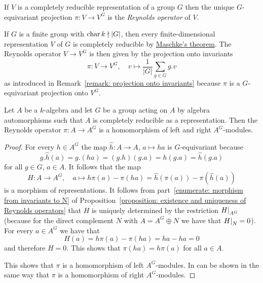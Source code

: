 \begin{definition}
  If $V$ is a completely reducible representation of a group $G$ then the unique $G$-equivariant projection $\pi \colon V \to V^G$ is the \emph{Reynolds operator} of $V$.
\end{definition}


\begin{example}
  If $G$ is a finite group with $\operatorname{char}{k} \nmid |G|$, then every finite-dimensional representation $V$ of $G$ is completely reducible by \hyperref[theorem: maschkes theorem]{Maschke’s theorem}.
  The Reynolds operator $V \to V^G$ is then given by the projection onto invariants
  \[
            \pi
    \colon  V
    \to     V^G,
    \quad   v
    \mapsto \frac{1}{|G|} \sum_{g \in G} g.v
  \]
  as introduced in Remark~\ref{remark: projection onto invariants} because $\pi$ is a $G$-equivariant projection onto $V^G$.
\end{example}


\begin{lemma}
  \label{lemma: reynolds operator is homomorphism}
  Let $A$ be a $k$-algebra and let $G$ be a group acting on $A$ by algebra automorphisms such that $A$ is completely reducible as a representation.
  Then the Reynolds operator $\pi \colon A \to A^G$ is a homomorphism of left and right $A^G$-modules.
\end{lemma}


\begin{proof}
  For every $h \in A^G$ the map $\hat{h} \colon A \to A$, $a \mapsto ha$ is $G$-equivariant because
  \[
      g.\hat{h}(a)
    = g.(ha)
    = (g.h)(g.a)
    = h(g.a)
    = \hat{h}(g.a)
  \]
  for all $g \in G$, $a \in A$.
  It follows that the map
  \[
            H
    \colon  A
    \to     A^G,
    \quad   a
    \mapsto h\pi(a) - \pi(ha)
    =       \hat{h}(\pi(a)) - \pi(\hat{h}(a))
  \]
  is a morphism of representations.
  It follows from part~\ref*{enumerate: morphism from invariants to N} of Proposition~\ref{proposition: existence and uniqueness of Reynolds operators} that $H$ is uniquely determined by the restriction $\restrict{H}{A^G}$ (because for the direct complement $N$ with $A = A^G \oplus N$ we have that $\restrict{H}{N} = 0$).
  For every $a \in A^G$ we have that
  \[
      H(a)
    = h\pi(a) - \pi(ha)
    = ha - ha
    = 0
  \]
  and therefore $H = 0$.
  This shows that $\pi(ha) = h\pi(a)$ for all $a \in A$.
  
  This shows that $\pi$ is a homomorphism of left $A^G$-modules.
  In can be shown in the same way that $\pi$ is a homomorphism of right $A^G$-modules.
\end{proof}



